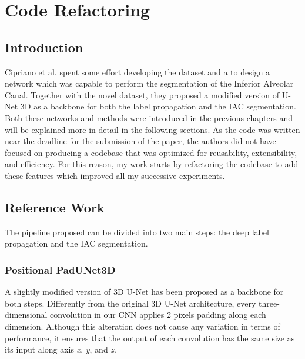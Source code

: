 
\chapter{Code Refactoring}

\label{chp:refwork}

\def\:{\hskip0pt} %
\section{Introduction}
Cipriano et al. spent some effort developing the dataset and a to design a
network which was capable to perform the segmentation of the Inferior Alveolar
Canal.
Together with the novel dataset, they proposed a modified version of
U-Net 3D as a backbone for both the label propagation and the IAC segmentation.
Both these networks and methods were introduced in the previous
chapters and will be explained more in detail in the following sections.
As the code was written near the deadline for the submission of the paper,
the authors did not have focused on producing a codebase that was optimized for
reusability, extensibility, and efficiency.
For this reason, my work starts by refactoring the codebase to add these features
which improved all my successive experiments.

\section{Reference Work}
The pipeline proposed can be divided into two main steps: the deep label
propagation and the IAC segmentation.

\subsection{Positional PadUNet3D}
A slightly modified version of 3D U-Net has been proposed as a backbone for both
steps. Differently from the original 3D U-Net architecture, every
three-dimensional convolution in our CNN applies 2 pixels padding along each
dimension. Although this alteration does not cause any variation in terms of
performance, it ensures that the output of each convolution has the same size as
its input along axis \emph{x}, \emph{y}, and \emph{z}.

